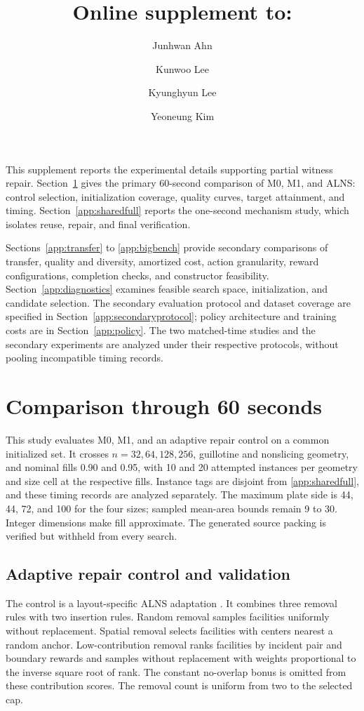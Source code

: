 \documentclass[11pt]{article}
\title{Online supplement to:\\
\emph{\PaperTitle}}
\author{Junhwan Ahn \and Kunwoo Lee \and Kyunghyun Lee \and Yeoneung Kim}
\author{}
\date{}
\begin{document}
\maketitle

\noindent This supplement reports the experimental details supporting partial
witness repair. Section~\ref{app:extended} gives the primary 60-second
comparison of M0, M1, and ALNS: control selection, initialization coverage,
quality curves, target attainment, and timing. Section~\ref{app:sharedfull}
reports the one-second mechanism study, which isolates reuse, repair, and
final verification.

Sections~\ref{app:transfer} to \ref{app:bigbench} provide secondary comparisons
of transfer, quality and diversity, amortized cost, action granularity,
reward configurations, completion checks, and constructor feasibility.
Section~\ref{app:diagnostics} examines feasible search space, initialization,
and candidate selection. The secondary evaluation protocol and dataset
coverage are specified in Section~\ref{app:secondaryprotocol}; policy
architecture and training costs are in Section~\ref{app:policy}.
The two matched-time studies and the secondary experiments are analyzed
under their respective protocols, without pooling incompatible timing records.

\section{Comparison through 60 seconds}
\label{app:extended}

This study evaluates M0, M1, and an adaptive repair control on a common
initialized set. It crosses $n=32,64,128,256$, guillotine and nonslicing
geometry, and nominal fills 0.90 and 0.95, with 10 and 20 attempted instances
per geometry and size cell at the respective fills. Instance tags are disjoint
from \ref{app:sharedfull}, and these timing records are analyzed separately. The maximum plate
side is 44, 44, 72, and 100 for the four sizes; sampled mean-area bounds
remain 9 to 30. Integer dimensions make fill approximate. The generated
source packing is verified but withheld from every search.

\subsection{Adaptive repair control and validation}
The control is a layout-specific ALNS adaptation \citep{Ropke2006ALNS}.
It combines three removal rules with two insertion rules. Random removal
samples facilities uniformly without replacement. Spatial removal selects
facilities with centers nearest a random anchor. Low-contribution removal
ranks facilities by incident pair and boundary rewards and samples without
replacement with weights proportional to the inverse square root of rank.
The constant no-overlap bonus is omitted from these contribution scores.
The removal count is uniform from two to the selected cap.
\end{document}
